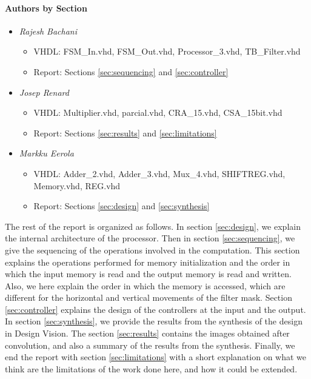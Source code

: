 \documentclass[11pt,a4paper]{article}
\begin{document}
\paragraph{Authors by Section}
\begin{itemize}
\item \textit{Rajesh Bachani} 
	\begin{itemize}
		\item VHDL: FSM\_In.vhd, FSM\_Out.vhd, Processor\_3.vhd, TB\_Filter.vhd
		\item Report: Sections \ref{sec:sequencing} and \ref{sec:controller}
	\end{itemize}
\item \textit{Josep Renard} 
	\begin{itemize}
		\item VHDL: Multiplier.vhd, parcial.vhd, CRA\_15.vhd, CSA\_15bit.vhd
		\item Report: Sections \ref{sec:results} and \ref{sec:limitations}
	\end{itemize}
\item \textit{Markku Eerola}
	\begin{itemize}
		\item VHDL: Adder\_2.vhd, Adder\_3.vhd, Mux\_4.vhd, SHIFTREG.vhd, Memory.vhd, REG.vhd
		\item Report: Sections \ref{sec:design} and \ref{sec:synthesis}
	\end{itemize}

\end{itemize}

The rest of the report is organized as follows. In section \ref{sec:design}, we explain the internal architecture of the processor. Then in section \ref{sec:sequencing}, we give the sequencing of the operations involved in the computation. This section explains the operations performed for memory initialization and the order in which the input memory is read and the output memory is read and written. Also, we here explain the order in which the memory is accessed, which are different for the horizontal and vertical movements of the filter mask. Section \ref{sec:controller} explains the design of the controllers at the input and the output. In section \ref{sec:synthesis}, we provide the results from the synthesis of the design in Design Vision. The section \ref{sec:results} contains the images obtained after convolution, and also a summary of the results from the synthesis. Finally, we end the report with section \ref{sec:limitations} with a short explanation on what we think are the limitations of the work done here, and how it could be extended.
\end{document}
